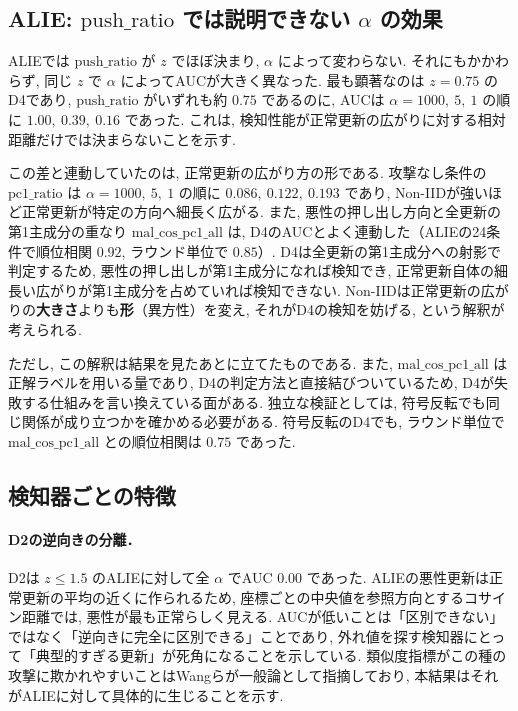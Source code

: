 \documentclass[a4j, twocolumn, dvipdfmx]{jsarticle}
\begin{document}
\subsection{ALIE: $\mathrm{push\_ratio}$ では説明できない $\alpha$ の効果}

ALIEでは $\mathrm{push\_ratio}$ が $z$ でほぼ決まり, $\alpha$ によって変わらない. それにもかかわらず, 同じ $z$ で $\alpha$ によってAUCが大きく異なった. 最も顕著なのは $z=0.75$ のD4であり, $\mathrm{push\_ratio}$ がいずれも約 $0.75$ であるのに, AUCは $\alpha=1000,\ 5,\ 1$ の順に $1.00,\ 0.39,\ 0.16$ であった. これは, 検知性能が正常更新の広がりに対する相対距離だけでは決まらないことを示す.

この差と連動していたのは, 正常更新の広がり方の形である. 攻撃なし条件の $\mathrm{pc1\_ratio}$ は $\alpha=1000,\ 5,\ 1$ の順に $0.086,\ 0.122,\ 0.193$ であり, Non-IIDが強いほど正常更新が特定の方向へ細長く広がる. また, 悪性の押し出し方向と全更新の第1主成分の重なり $\mathrm{mal\_cos\_pc1\_all}$ は, D4のAUCとよく連動した（ALIEの24条件で順位相関 $0.92$, ラウンド単位で $0.85$）. D4は全更新の第1主成分への射影で判定するため, 悪性の押し出しが第1主成分になれば検知でき, 正常更新自体の細長い広がりが第1主成分を占めていれば検知できない. Non-IIDは正常更新の広がりの\textbf{大きさ}よりも\textbf{形}（異方性）を変え, それがD4の検知を妨げる, という解釈が考えられる.

ただし, この解釈は結果を見たあとに立てたものである. また, $\mathrm{mal\_cos\_pc1\_all}$ は正解ラベルを用いる量であり, D4の判定方法と直接結びついているため, D4が失敗する仕組みを言い換えている面がある. 独立な検証としては, 符号反転でも同じ関係が成り立つかを確かめる必要がある. 符号反転のD4でも, ラウンド単位で $\mathrm{mal\_cos\_pc1\_all}$ との順位相関は $0.75$ であった.

\subsection{検知器ごとの特徴}

\paragraph{D2の逆向きの分離．}
D2は $z \le 1.5$ のALIEに対して全 $\alpha$ でAUC $0.00$ であった. ALIEの悪性更新は正常更新の平均の近くに作られるため, 座標ごとの中央値を参照方向とするコサイン距離では, 悪性が最も正常らしく見える. AUCが低いことは「区別できない」ではなく「逆向きに完全に区別できる」ことであり, 外れ値を探す検知器にとって「典型的すぎる更新」が死角になることを示している. 類似度指標がこの種の攻撃に欺かれやすいことはWangら\cite{wang2023trust}が一般論として指摘しており, 本結果はそれがALIEに対して具体的に生じることを示す.
\end{document}
